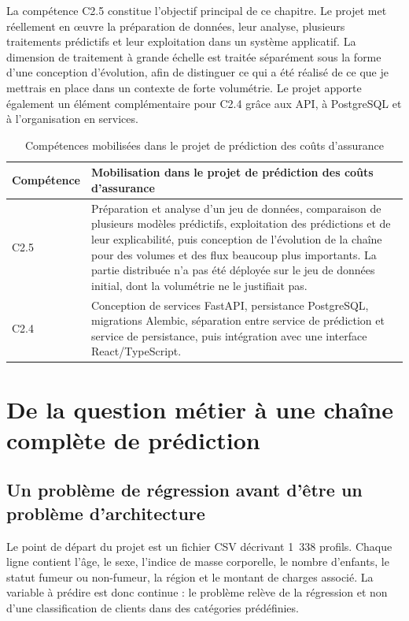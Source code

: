 La compétence C2.5 constitue l'objectif principal de ce chapitre. Le projet met réellement en œuvre la préparation de données, leur analyse, plusieurs traitements prédictifs et leur exploitation dans un système applicatif. La dimension de traitement à grande échelle est traitée séparément sous la forme d'une conception d'évolution, afin de distinguer ce qui a été réalisé de ce que je mettrais en place dans un contexte de forte volumétrie. Le projet apporte également un élément complémentaire pour C2.4 grâce aux API, à PostgreSQL et à l'organisation en services.

\begin{table}[H]
\centering
\begin{tabular}{p{2.2cm} p{11.8cm}}
\toprule
\textbf{Compétence} & \textbf{Mobilisation dans le projet de prédiction des coûts d'assurance} \\
\midrule
C2.5 & Préparation et analyse d'un jeu de données, comparaison de plusieurs modèles prédictifs, exploitation des prédictions et de leur explicabilité, puis conception de l'évolution de la chaîne pour des volumes et des flux beaucoup plus importants. La partie distribuée n'a pas été déployée sur le jeu de données initial, dont la volumétrie ne le justifiait pas. \\
C2.4 & Conception de services FastAPI, persistance PostgreSQL, migrations Alembic, séparation entre service de prédiction et service de persistance, puis intégration avec une interface React/TypeScript. \\
\bottomrule
\end{tabular}
\caption{Compétences mobilisées dans le projet de prédiction des coûts d'assurance}
\label{tab:competences-insurance}
\end{table}

\section{De la question métier à une chaîne complète de prédiction}

\subsection{Un problème de régression avant d'être un problème d'architecture}

Le point de départ du projet est un fichier CSV décrivant 1~338 profils. Chaque ligne contient l'âge, le sexe, l'indice de masse corporelle, le nombre d'enfants, le statut fumeur ou non-fumeur, la région et le montant de charges associé. La variable à prédire est donc continue : le problème relève de la régression et non d'une classification de clients dans des catégories prédéfinies.

